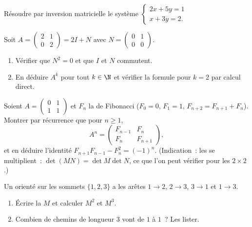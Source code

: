 \begin{exercise}[$\star$]\label{exo:g12:matrix:3}
Résoudre par inversion matricielle le système
$\begin{cases} 2x + 5y = 1\\ x + 3y = 2 . \end{cases}$
\end{exercise}

\begin{exercise}[$\star\star$]\label{exo:g12:matrix:4}
Soit $A = \begin{pmatrix} 2 & 1\\ 0 & 2\end{pmatrix} = 2I + N$ avec
$N = \begin{pmatrix} 0 & 1\\ 0 & 0 \end{pmatrix}$.
\begin{enumerate}
  \item Vérifier que $N^2 = 0$ et que $I$ et $N$ commutent.
  \item En déduire $A^k$ pour tout $k \in \N$ et vérifier la formule pour
        $k=2$ par calcul direct.
\end{enumerate}
\end{exercise}

\begin{exercise}[$\star\star$]\label{exo:g12:matrix:5}
Soient $A = \begin{pmatrix} 0 & 1\\ 1 & 1\end{pmatrix}$ et $F_n$ la 
de Fibonacci ($F_0 = 0$, $F_1 = 1$, $F_{n+2} = F_{n+1} + F_n$). Montrer par
récurrence que pour $n \geq 1$,
\[
A^n = \begin{pmatrix} F_{n-1} & F_n\\ F_n & F_{n+1}\end{pmatrix},
\]
et en déduire l'identité $F_{n+1}F_{n-1} - F_n^2 = (-1)^n$.
(Indication~: les  se multiplient~: $\det(MN) = \det M \det N$,
ce que l'on peut vérifier pour les  $2\times2$.)
\end{exercise}

\begin{exercise}[$\star\star$]\label{exo:g12:matrix:6}
Un  orienté sur les sommets $\{1, 2, 3\}$ a les arêtes
$1\to2$, $2\to3$, $3\to1$ et $1\to3$.
\begin{enumerate}
  \item Écrire la  $M$ et calculer $M^2$ et $M^3$.
  \item Combien de chemins de longueur $3$ vont de $1$ à $1$~? Les lister.
\end{enumerate}
\end{exercise}

